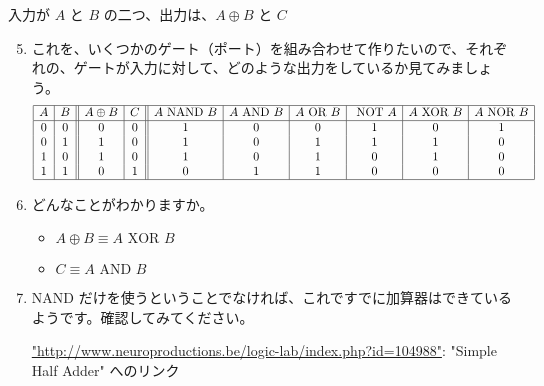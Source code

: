 \documentclass[10pt, dvipdfmx]{beamer}
\begin{document}
\begin{frame}{入力が \(A\) と \(B\) の二つ、出力は、\(A\oplus B\) と \(C\) }
\begin{enumerate}
\setcounter{enumi}{4}
\item これを、いくつかのゲート（ポート）を組み合わせて作りたいので、それぞれの、ゲートが入力に対して、どのような出力をしているか見てみましょう。
{\scriptsize
\[ \begin{array}{|c|c||c|c||c|c|c|c|c|c|c|} \hline A  & B  & A\oplus B  & C  & A \mbox{ NAND } B  & A \mbox{ AND } B  & A \mbox{ OR } B  & \mbox{ NOT } A  & A \mbox{ XOR } B  & A \mbox{ NOR } B\\ \hline 0  & 0  & 0  & 0  & 1  & 0  & 0  & 1  & 0  & 1 \\ 0  & 1  & 1  & 0  & 1  & 0  & 1  & 1  & 1  & 0 \\ 1  & 0  & 1  & 0  & 1  & 0  & 1  & 0  & 1  & 0 \\ 1  & 1  & 0  & 1  & 0  & 1  & 1  & 0  & 0  & 0 \\ \hline \end{array} \]
}
\item どんなことがわかりますか。
\begin{itemize}
    \item \(A \oplus B \equiv A \mbox{ XOR } B\)
    \item \(C \equiv A \mbox{ AND } B\)
 \end{itemize}

\item NAND だけを使うということでなければ、これですでに加算器はできているようです。確認してみてください。

\url{"http://www.neuroproductions.be/logic-lab/index.php?id=104988"}: "Simple Half Adder" へのリンク

\end{enumerate}
\end{frame}
\end{document}
